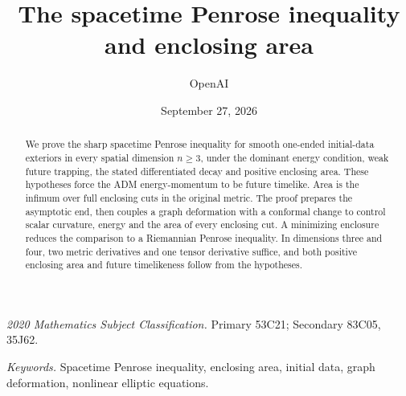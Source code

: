 \documentclass[11pt]{article}
\title{The spacetime Penrose inequality and enclosing area}
\author{OpenAI}
\date{September 27, 2026}
\begin{document}
\maketitle
\begin{abstract}
We prove the sharp spacetime Penrose inequality for smooth one-ended
initial-data exteriors in every spatial dimension $n\ge3$, under the
dominant energy condition, weak future trapping, the stated differentiated
decay and positive enclosing area. These hypotheses force the ADM
energy-momentum to be future timelike. Area is the infimum over full
enclosing cuts in the original metric. The proof prepares the asymptotic end, then couples a graph deformation
with a conformal change to control scalar curvature, energy and the area
of every enclosing cut. A minimizing enclosure reduces the comparison
to a Riemannian Penrose inequality. In dimensions three and four,
two metric derivatives and one tensor derivative suffice, and both
positive enclosing area and future timelikeness follow from the hypotheses.
\end{abstract}
\noindent\textit{2020 Mathematics Subject Classification.}
Primary 53C21; Secondary 83C05, 35J62.

\smallskip
\noindent\textit{Keywords.} Spacetime Penrose inequality, enclosing area,
initial data, graph deformation, nonlinear elliptic equations.

\setcounter{tocdepth}{2}
\tableofcontents










\end{document}
